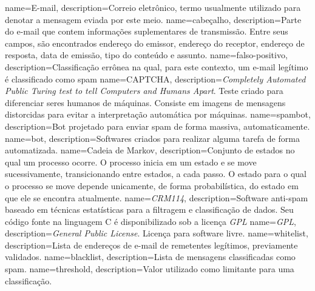  {
	name={E-mail}, 
	description={Correio eletrônico, termo usualmente utilizado para denotar a mensagem eviada por este meio.}
}
 {
	name={cabeçalho}, 
	description={Parte do e-mail que contem informações suplementares de transmissão. Entre seus campos, são encontrados endereço do emissor, endereço do receptor, endereço de resposta, data de emissão, tipo do conteúdo e assunto.}
}
 {
	name={falso-positivo}, 
	description={Classificação errônea na qual, para este contexto, um e-mail legítimo é classificado como spam}
}
 {
	name={CAPTCHA}, description={\emph{Completely Automated Public Turing test to tell Computers and Humans Apart}. Teste criado para diferenciar seres humanos de máquinas. Consiste em imagens de mensagens distorcidas para evitar a interpretação automática por máquinas.}
}
 {
	name={spambot},
	description={Bot projetado para enviar spam de forma massiva, automaticamente.}
}
 {
	name={bot}, 
	description={Softwares criados para realizar alguma tarefa de forma automatizada.}
}
 {
	name={Cadeia de Markov}, description={Conjunto de estados no qual um processo ocorre. O processo inicia em um estado e se move sucessivamente, transicionando entre estados, a cada passo. O estado para o qual o processo se move depende unicamente, de forma probabilística, do estado em que ele se encontra atualmente.}
}
 {
	name={\emph{CRM114}, 
	description={Software anti-spam baseado em técnicas estatísticas para a filtragem e classificação de dados. Seu código fonte na linguagem C é disponibilizado sob a licença \emph{GPL}}}
}
 {
	name={\emph{GPL}, 
	description={\emph{General Public License}. Licença para software livre.}}
}
 {
	name={whitelist}, 
	description={Lista de endereços de e-mail de remetentes legítimos, previamente validados.}
	}
 {
	name={blacklist}, 
	description={Lista de mensagens classificadas como spam.}
	}
 {
	name={threshold}, 
	description={Valor utilizado como limitante para uma classificação.}
}
